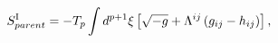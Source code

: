 \begin{equation}
S^{{\rm I}}_{parent}=-T_{p}\int d^{p+1}{\xi}\left[\sqrt{-g}+{\Lambda}^{ij}
\left(g_{ij}-h_{ij}\right)\right],
\end{equation}

